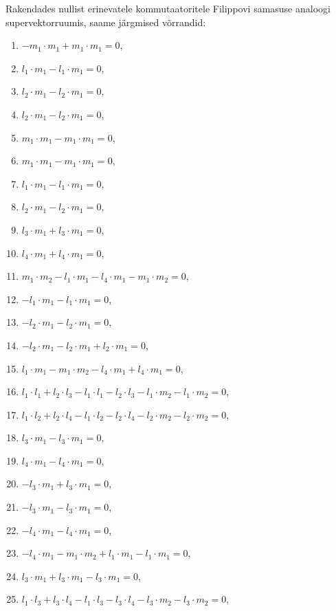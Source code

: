 Rakendades nullist erinevatele kommutaatoritele Filippovi samasuse analoogi
supervektorruumis, saame järgmised võrrandid:
\begin{enumerate}
    \item $-m_1 \cdot m_1 + m_1 \cdot m_1 = 0$,
    \item $l_1 \cdot m_1 - l_1 \cdot m_1 = 0$,
    \item $l_2 \cdot m_1 - l_2 \cdot m_1 = 0$,
    \item $l_2 \cdot m_1 - l_2 \cdot m_1 = 0$,
    \item $m_1 \cdot m_1 - m_1 \cdot m_1 = 0$,
    \item $m_1 \cdot m_1 - m_1 \cdot m_1 = 0$,
    \item $l_1 \cdot m_1 - l_1 \cdot m_1 = 0$,
    \item $l_2 \cdot m_1 - l_2 \cdot m_1 = 0$,
    \item $l_3 \cdot m_1 + l_3 \cdot m_1 = 0$,
    \item $l_4 \cdot m_1 + l_4 \cdot m_1 = 0$,
    \item $m_1 \cdot m_2 - l_1 \cdot m_1 - l_4 \cdot m_1 - m_1 \cdot m_2 = 0$,
    \item $-l_1 \cdot m_1 - l_1 \cdot m_1 = 0$,
    \item $-l_2 \cdot m_1 - l_2 \cdot m_1 = 0$,
    \item $-l_2 \cdot m_1 - l_2 \cdot m_1 + l_2 \cdot m_1 = 0$,
    \item $l_1 \cdot m_1 - m_1 \cdot m_2 - l_4 \cdot m_1 + l_4 \cdot m_1 = 0$,
    \item $l_1 \cdot l_1 + l_2 \cdot l_3 - l_1 \cdot l_1 - l_2 \cdot l_3 - l_1 \cdot m_2 - l_1 \cdot m_2 = 0$,
    \item $l_1 \cdot l_2 + l_2 \cdot l_4 - l_1 \cdot l_2 - l_2 \cdot l_4 - l_2 \cdot m_2 - l_2 \cdot m_2 = 0$,
    \item $l_3 \cdot m_1 - l_3 \cdot m_1 = 0$,
    \item $l_4 \cdot m_1 - l_4 \cdot m_1 = 0$,
    \item $-l_3 \cdot m_1 + l_3 \cdot m_1 = 0$,
    \item $-l_3 \cdot m_1 - l_3 \cdot m_1 = 0$,
    \item $-l_4 \cdot m_1 - l_4 \cdot m_1 = 0$,
    \item $-l_4 \cdot m_1 - m_1 \cdot m_2 + l_1 \cdot m_1 - l_1 \cdot m_1 = 0$,
    \item $l_3 \cdot m_1 + l_3 \cdot m_1 - l_3 \cdot m_1 = 0$,
    \item $l_1 \cdot l_3 + l_3 \cdot l_4 - l_1 \cdot l_3 - l_3 \cdot l_4 - l_3 \cdot m_2 - l_3 \cdot m_2 = 0$,

\end{enumerate}
